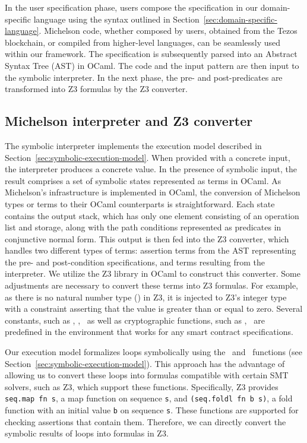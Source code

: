 \documentclass[a4paper,USenglish,cleveref, autoref, thm-restate]{lipics-v2021}
\begin{document}
In the user specification phase, users compose the specification in
our domain-specific language using the syntax outlined in
Section~\ref{sec:domain-specific-language}. Michelson code, whether
composed by users, obtained from the Tezos blockchain, or compiled
from higher-level languages, can be seamlessly used within our
framework. The specification is subsequently parsed into an Abstract
Syntax Tree (AST) in OCaml. The code and the input pattern are then
input to the symbolic interpreter. In the next phase, the pre- and
post-predicates are transformed into Z3 formulas by the Z3 converter.

\subsection{Michelson interpreter and Z3 converter}
\label{sec:mich-interpr-z3}
The symbolic interpreter implements the execution model described in
Section~\ref{sec:symbolic-execution-model}. When provided with a
concrete input, the interpreter produces a concrete value. In the
presence of symbolic input, the result comprises a set of symbolic
states represented as terms in OCaml. As Michelson's infrastructure is
implemented in OCaml, the conversion of Michelson types or terms to
their OCaml counterparts is straightforward. Each state contains the
output stack, which has only one element consisting of an operation
list and storage, along with the path conditions represented as
predicates in conjunctive normal form. This output is then fed into
the Z3 converter, which handles two different types of terms:
assertion terms from the AST representing the pre- and post-condition
specifications, and terms resulting from the interpreter. We utilize
the Z3 library in OCaml to construct this converter. Some adjustments
are necessary to convert these terms into Z3 formulas. For example, as
there is no natural number type (\TNAT) in Z3, it is injected to Z3's
integer type with a constraint asserting that the value is greater
than or equal to zero. Several constants, such as \CAMOUNT, \CBALANCE,
\CSENDER\ as well as cryptographic functions, such as \FSHA,
\FHASHKEY\ are predefined in the environment that works for any smart
contract specifications. 

Our execution model formalizes loops symbolically using the \FOLD\ and
\FMAP\ functions (see
Section~\ref{sec:symbolic-execution-model}). This approach has the
advantage of allowing us to convert these loops into formulas
compatible with certain SMT solvers, such as Z3, which support these
functions. Specifically, Z3 provides \lstinline/seq.map fn s/, a map
function on sequence \lstinline/s/, and
\lstinline/(seq.foldl fn b s)/, a fold function with an initial value \lstinline/b/ on sequence
\lstinline/s/. These functions are supported for checking assertions
that contain them. Therefore, we can directly convert the symbolic
results of loops into formulas in Z3. 
\end{document}
